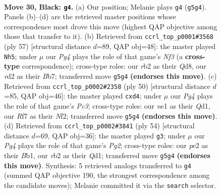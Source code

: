 \documentclass[11pt]{article}
\begin{document}
\clearpage

\begin{figure}[p]\centering
\begin{subfigure}{0.46\textwidth}\centering
\resizebox{\linewidth}{!}{%
\newchessgame
\chessboard[
  setfen={1r1q2k1/p1n1brn1/b6p/P1p2pp1/3p1P2/1P2N1P1/QR1RP1BP/2B1N1K1 b - - 1 30},
  showmover=false,
  pgfstyle=straightmove, color=movearrow, markmove={g5-g4}
]}
\caption{}
\end{subfigure}\hfill
\begin{subfigure}{0.46\textwidth}\centering
\resizebox{\linewidth}{!}{%
\newchessgame
\chessboard[
  setfen={3qr3/1b1r1pbk/1p1p1npp/pN6/P1P1PP2/1P5P/1B2R1BK/3Q1R2 b - - 6 29},
  showmover=false,
  pgfstyle=straightmove, color=movearrow, markmove={f6-h5}
]}
\caption{}
\end{subfigure}
\\[4pt]
\begin{subfigure}{0.46\textwidth}\centering
\resizebox{\linewidth}{!}{%
\newchessgame
\chessboard[
  setfen={r1r4k/1bqnb1pp/4p3/p2pPp2/3p1P2/2PBB3/RP3NPP/R2Q2K1 w - - 0 26},
  showmover=false,
  pgfstyle=straightmove, color=movearrow, markmove={c3-d4}
]}
\caption{}
\end{subfigure}\hfill
\begin{subfigure}{0.46\textwidth}\centering
\resizebox{\linewidth}{!}{%
\newchessgame
\chessboard[
  setfen={2brr1k1/p1q1b1p1/2p1p2p/1pP2p2/3P1n2/PPN2R2/1B3PPP/1B1QR1K1 w - - 0 28},
  showmover=false,
  pgfstyle=straightmove, color=movearrow, markmove={g2-g3}
]}
\caption{}
\end{subfigure}
\caption{\textbf{Move 30, Black: \texttt{g4}.} (a) Our position; Melanie plays \texttt{g4} (\texttt{g5g4}). Panels (b)--(d) are the retrieved master positions whose correspondence most drove this move (highest QAP objective among those that transfer to it). (b) Retrieved from \texttt{ccrl\_top\_p0001\#3568} (ply 57) [structural distance $d$=89, QAP obj=48]: the master played \texttt{Nh5}; under $\mu$ our \emph{Pg4} plays the role of that game's \emph{Nf3} (a \textbf{cross-type} correspondence); cross-type roles: our \emph{r}b2 as their \emph{Q}d8, our \emph{r}d2 as their \emph{B}b7; transferred move \texttt{g5g4} \textbf{(endorses this move)}. (c) Retrieved from \texttt{ccrl\_top\_p0002\#2358} (ply 50) [structural distance $d$=85, QAP obj=46]: the master played \texttt{cxd4}; under $\mu$ our \emph{Pg4} plays the role of that game's \emph{Pc3}; cross-type roles: our \emph{n}e1 as their \emph{Q}d1, our \emph{R}f7 as their \emph{N}f2; transferred move \texttt{g5g4} \textbf{(endorses this move)}. (d) Retrieved from \texttt{ccrl\_top\_p0002\#3841} (ply 54) [structural distance $d$=69, QAP obj=36]: the master played \texttt{g3}; under $\mu$ our \emph{Pg4} plays the role of that game's \emph{Pg2}; cross-type roles: our \emph{p}e2 as their \emph{B}b1, our \emph{r}b2 as their \emph{Q}d1; transferred move \texttt{g5g4} \textbf{(endorses this move)}. Synthesis: 5 retrieved analogs transferred to \texttt{g4} (summed QAP objective 190, the strongest correspondence among the candidate moves); Melanie committed it via the \texttt{search} selector.}
\label{fig:thought-m59}
\end{figure}
\end{document}

